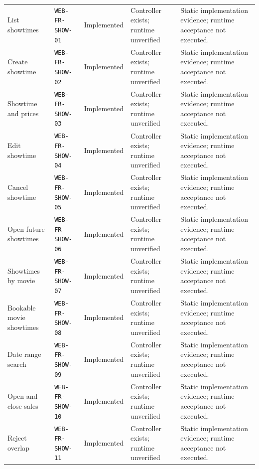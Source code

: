 \begin{longtable}{@{}P{0.19000\SRSWidth}P{0.18000\SRSWidth}P{0.15000\SRSWidth}P{0.20000\SRSWidth}P{0.28000\SRSWidth}@{}}
List showtimes & \texttt{WEB-\allowbreak{}FR-\allowbreak{}SHOW-\allowbreak{}01} & Implemented & Controller exists; runtime unverified & Static implementation evidence; runtime acceptance not executed. \\[3pt]
Create showtime & \texttt{WEB-\allowbreak{}FR-\allowbreak{}SHOW-\allowbreak{}02} & Implemented & Controller exists; runtime unverified & Static implementation evidence; runtime acceptance not executed. \\[3pt]
Showtime and prices & \texttt{WEB-\allowbreak{}FR-\allowbreak{}SHOW-\allowbreak{}03} & Implemented & Controller exists; runtime unverified & Static implementation evidence; runtime acceptance not executed. \\[3pt]
Edit showtime & \texttt{WEB-\allowbreak{}FR-\allowbreak{}SHOW-\allowbreak{}04} & Implemented & Controller exists; runtime unverified & Static implementation evidence; runtime acceptance not executed. \\[3pt]
Cancel showtime & \texttt{WEB-\allowbreak{}FR-\allowbreak{}SHOW-\allowbreak{}05} & Implemented & Controller exists; runtime unverified & Static implementation evidence; runtime acceptance not executed. \\[3pt]
Open future showtimes & \texttt{WEB-\allowbreak{}FR-\allowbreak{}SHOW-\allowbreak{}06} & Implemented & Controller exists; runtime unverified & Static implementation evidence; runtime acceptance not executed. \\[3pt]
Showtimes by movie & \texttt{WEB-\allowbreak{}FR-\allowbreak{}SHOW-\allowbreak{}07} & Implemented & Controller exists; runtime unverified & Static implementation evidence; runtime acceptance not executed. \\[3pt]
Bookable movie showtimes & \texttt{WEB-\allowbreak{}FR-\allowbreak{}SHOW-\allowbreak{}08} & Implemented & Controller exists; runtime unverified & Static implementation evidence; runtime acceptance not executed. \\[3pt]
Date range search & \texttt{WEB-\allowbreak{}FR-\allowbreak{}SHOW-\allowbreak{}09} & Implemented & Controller exists; runtime unverified & Static implementation evidence; runtime acceptance not executed. \\[3pt]
Open and close sales & \texttt{WEB-\allowbreak{}FR-\allowbreak{}SHOW-\allowbreak{}10} & Implemented & Controller exists; runtime unverified & Static implementation evidence; runtime acceptance not executed. \\[3pt]
Reject overlap & \texttt{WEB-\allowbreak{}FR-\allowbreak{}SHOW-\allowbreak{}11} & Implemented & Controller exists; runtime unverified & Static implementation evidence; runtime acceptance not executed. \\[3pt]

\end{longtable}
